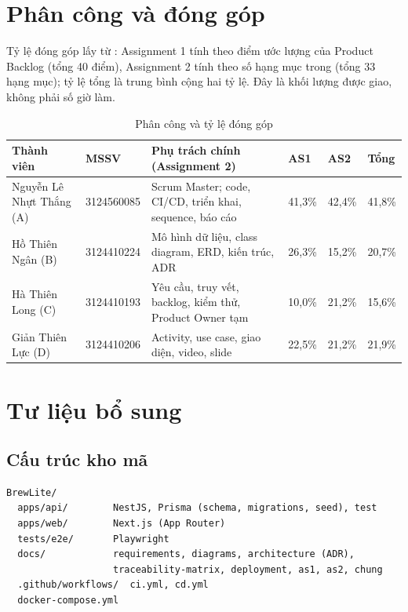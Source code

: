 \documentclass[a4paper]{article}
\begin{document}
\section{Phân công và đóng góp}\label{app:phancong}
Tỷ lệ đóng góp lấy từ : Assignment 1 tính theo điểm ước lượng của Product Backlog (tổng 40 điểm), Assignment 2 tính theo số hạng mục trong  (tổng 33 hạng mục); tỷ lệ tổng là trung bình cộng hai tỷ lệ. Đây là khối lượng được giao, không phải số giờ làm.
\begin{table}[htbp]\centering\small
\caption{Phân công và tỷ lệ đóng góp}\label{tab:donggop}
\begin{tabular}{@{}>{\raggedright\arraybackslash}p{3.2cm}p{1.8cm}>{\raggedright\arraybackslash}p{4.0cm}p{1.05cm}p{1.05cm}p{1.05cm}@{}}\toprule
\textbf{Thành viên} & \textbf{MSSV} & \textbf{Phụ trách chính (Assignment 2)} & \textbf{AS1} & \textbf{AS2} & \textbf{Tổng} \\ \midrule
Nguyễn Lê Nhựt Thắng (A) & 3124560085 & Scrum Master; code, CI/CD, triển khai, sequence, báo cáo & 41,3\% & 42,4\% & 41,8\% \\
Hồ Thiên Ngân (B) & 3124410224 & Mô hình dữ liệu, class diagram, ERD, kiến trúc, ADR & 26,3\% & 15,2\% & 20,7\% \\
Hà Thiên Long (C) & 3124410193 & Yêu cầu, truy vết, backlog, kiểm thử, Product Owner tạm & 10,0\% & 21,2\% & 15,6\% \\
Giản Thiên Lực (D) & 3124410206 & Activity, use case, giao diện, video, slide & 22,5\% & 21,2\% & 21,9\% \\ \bottomrule
\end{tabular}
\end{table}

\section{Tư liệu bổ sung}\label{app:khac}
\subsection{Cấu trúc kho mã}\label{app:khac1}
\begin{lstlisting}[caption={Cấu trúc thư mục chính của repository},label={lst:tree}]
BrewLite/
  apps/api/        NestJS, Prisma (schema, migrations, seed), test
  apps/web/        Next.js (App Router)
  tests/e2e/       Playwright
  docs/            requirements, diagrams, architecture (ADR),
                   traceability-matrix, deployment, as1, as2, chung
  .github/workflows/  ci.yml, cd.yml
  docker-compose.yml
\end{lstlisting}
\end{document}
